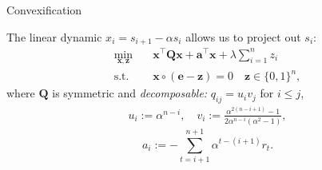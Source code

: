 \documentclass[15pt]{beamer}
\theoremstyle{definition}
\begin{document}
\begin{frame}{Convexification}

The linear dynamic $x_i = s_{i+1} - \alpha s_i$ allows us to project out  $s_i$:
\begin{align*}
	\min_{\mathbf{x}, \mathbf{z}} \quad & \mathbf{x}^\top \mathbf{Q} \mathbf{x} + \mathbf{a}^\top \mathbf{x} + \lambda \sum_{i=1}^n z_i \\
	\text{s.t.} \quad 
	& \mathbf{x} \circ (\mathbf{e} - \mathbf{z}) = 0 
	\quad
 \mathbf{z} \in \{0, 1\}^n,
\end{align*}
where $\mathbf{Q}$ is symmetric and \emph{decomposable:}
$q_{ij} = u_i v_j$ for $i \le j$,
\begin{align*}
	u_i := \alpha^{n-i}, \quad
	v_i := \frac{\alpha^{2(n-i+1)} - 1}{2\alpha^{n-i}(\alpha^2 - 1)}, 
\end{align*}
\begin{equation*}
	a_i := -\sum_{t=i+1}^{n+1} \alpha^{t-(i+1)} r_t.
\end{equation*}



 
\end{frame}
\end{document}
